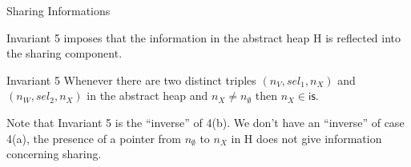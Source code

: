 \documentclass[xcolor=svgnames,11pt]{beamer}
\begin{document}
\begin{frame}{Sharing Informations}

Invariant 5 imposes that the information in the abstract heap \textsf{H} is reflected into the sharing component.
\medskip
\begin{block}{Invariant 5}
\textrm{Whenever there are two distinct triples $(n_V, sel_1, n_X)$ and $(n_W, sel_2, n_X)$ in the abstract heap and $n_X \neq n_\emptyset$ then $n_X \in \mathsf{is}$.
}
\end{block}
\medskip

Note that Invariant 5 is the ``inverse'' of 4(b). We don't have an ``inverse'' of case 4(a), the presence of a pointer from $n_\emptyset$ to $n_X$ in H does not give information concerning sharing.

\end{frame}
\end{document}
